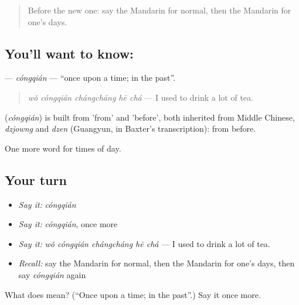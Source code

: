 \label{lesson:ZH-C178-congqian}



\begin{quote}
Before the new one: say the Mandarin for normal, then the Mandarin for one's days.
\end{quote}

\subsection*{You'll want to know: }
\textbf{} — \emph{cóngqián} — \textquotedblleft{}once upon a time; in the past\textquotedblright{}.

\begin{quote}
\textbf{} \emph{wǒ cóngqián chángcháng hē chá} — I used to drink a lot of tea.
\end{quote}

\begin{cousinweb}
\textbf{} (\emph{cóngqián}) is built from  'from' and  'before', both inherited from Middle Chinese, \emph{dzjowng} and \emph{dzen} (Guangyun, in Baxter's transcription): from before.
\end{cousinweb}

\begin{grammarlens}[title={What you've built}]
One more word for times of day.
\end{grammarlens}

\subsection*{Your turn}
\begin{itemize}
\raggedright
  \item \emph{Say it:} \emph{cóngqián}
  \item \emph{Say it:} \emph{cóngqián}, once more
  \item \emph{Say it:} \emph{wǒ cóngqián chángcháng hē chá} — I used to drink a lot of tea.
  \item \emph{Recall:} say the Mandarin for normal, then the Mandarin for one's days, then say \emph{cóngqián} again
\end{itemize}

\begin{tcolorbox}[breakable,colback=teal!4,colframe=teal!35!black,title={Before you move on}]
What does  mean? (\textquotedblleft{}Once upon a time; in the past\textquotedblright{}.) Say it once more.
\end{tcolorbox}
